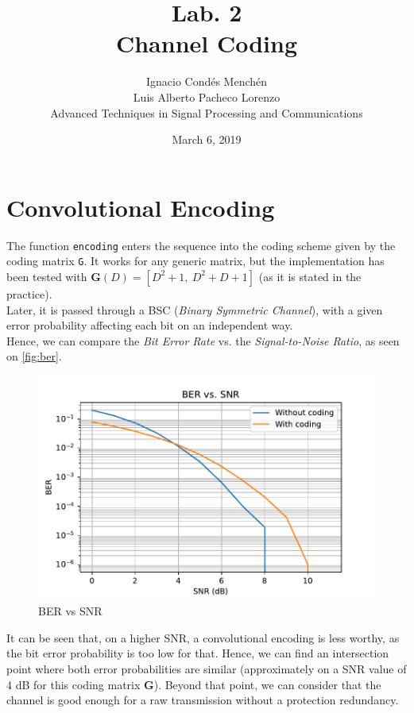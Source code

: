 \documentclass[11pt,a4paper]{article}
\date{March 6, 2019}
\begin{document}
	
	\title{\textbf{Lab. 2\\\LARGE{Channel Coding}}}
	\author{Ignacio Condés Menchén\\Luis Alberto Pacheco Lorenzo\\Advanced Techniques in Signal Processing and Communications}
	\maketitle
	
\section*{Convolutional Encoding}
The function \texttt{encoding} enters the sequence into the coding scheme given by the coding matrix \texttt{G}. It works for any generic matrix, but the implementation has been tested with $\mathbf{G}(D) = [D^2 + 1,\  D^2+D+1]$ (as it is stated in the practice).\\

Later, it is passed through a BSC (\textit{Binary Symmetric Channel}), with a given error probability affecting each bit on an independent way.\\


Hence, we can compare the \textit{Bit Error Rate} vs. the \textit{Signal-to-Noise Ratio}, as seen on \autoref{fig:ber}.



\begin{figure}[h]
	\centering
	\includegraphics{figs/BER10000}
	\caption{BER vs SNR}
	\label{fig:ber}
\end{figure}



It can be seen that, on a higher SNR, a convolutional encoding is less worthy, as the bit error probability is too low for that. Hence, we can find an intersection point where both error probabilities are similar (approximately on a SNR value of 4 dB for this coding matrix \textbf{G}). Beyond that point, we can consider that the channel is good enough for a raw transmission without a protection redundancy.\\
\end{document}
